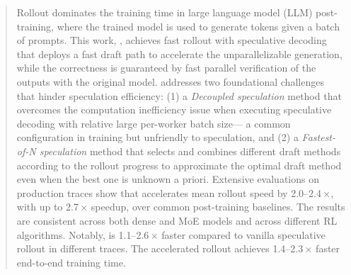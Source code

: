 \begin{abstract}
    \noindent
    Rollout dominates the training time in large language model (LLM) post-training,
    where the trained model is used to generate tokens given a batch of prompts.
    This work, {\sys}, achieves fast rollout with speculative decoding that deploys
    a fast draft path to accelerate the unparallelizable generation,
    while the correctness is guaranteed by fast parallel verification of the outputs with the original model.
    {\sys} addresses two foundational challenges that hinder 
    speculation efficiency:
    (1) a \emph{Decoupled speculation} method
    that overcomes the computation inefficiency issue when executing 
    speculative decoding with relative large per-worker batch size---
    a common configuration in training but unfriendly to speculation, 
    and (2) a \emph{Fastest-of-N speculation} method that selects and combines different draft methods
    according to the rollout progress to approximate the optimal draft method
    even when the best one is unknown a priori. 
    Extensive evaluations on production traces
    show that {\sys} accelerates mean rollout speed by {2.0--2.4}\,$\times$, 
    with up to {2.7}\,$\times$ speedup, over common post-training baselines.
    The results are consistent across both dense and MoE models and across different RL algorithms.
	Notably, {\sys} is {1.1--2.6}\,$\times$ faster
	compared to vanilla speculative rollout in different traces. 
    The accelerated rollout achieves {1.4--2.3}\,$\times$ faster end-to-end training time.

 \end{abstract}
